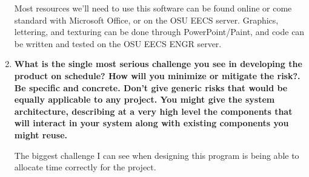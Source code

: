 \documentclass[12pt, letterpaper]{article}
\begin{document}
\begin{enumerate}
	Most resources we’ll need to use this software can be found online or come standard with Microsoft Office, or on the OSU EECS server. Graphics, lettering, and texturing can be done through PowerPoint/Paint, and code can be written and tested on the OSU EECS ENGR server.
	
	\item \textbf{What is the single most serious challenge you see in developing the product on schedule? How will you minimize or mitigate the risk?. Be specific and concrete. Don't give generic risks that would be equally applicable to any project. You might give the system architecture, describing at a very high level the components that will interact in your system along with existing components you might reuse.}	
	
	The biggest challenge I can see when designing this program is being able to allocate time correctly for the project. 
	
\end{enumerate}
\end{document}
